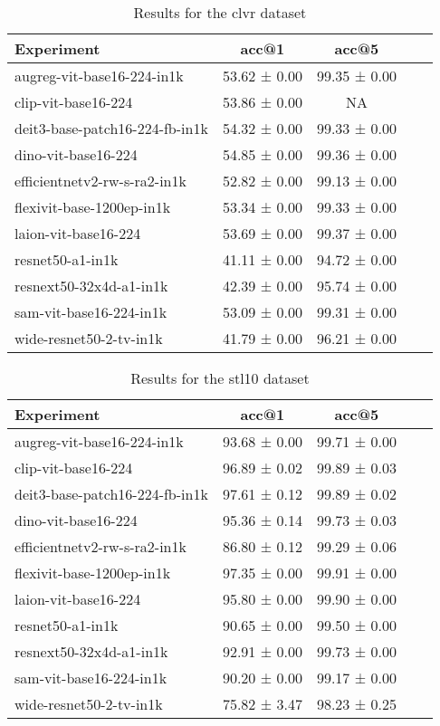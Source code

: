 \begin{table}[htbp]
\caption{Results for the clvr dataset}
\begin{tabular}{|l|c|c|c|c|}\hline
Experiment & acc@1 & acc@5\\
\hline
augreg-vit-base16-224-in1k & 53.62 ± 0.00 & 99.35 ± 0.00\\
\hline
clip-vit-base16-224 & 53.86 ± 0.00 & NA\\
\hline
deit3-base-patch16-224-fb-in1k & 54.32 ± 0.00 & 99.33 ± 0.00\\
\hline
dino-vit-base16-224 & 54.85 ± 0.00 & 99.36 ± 0.00\\
\hline
efficientnetv2-rw-s-ra2-in1k & 52.82 ± 0.00 & 99.13 ± 0.00\\
\hline
flexivit-base-1200ep-in1k & 53.34 ± 0.00 & 99.33 ± 0.00\\
\hline
laion-vit-base16-224 & 53.69 ± 0.00 & 99.37 ± 0.00\\
\hline
resnet50-a1-in1k & 41.11 ± 0.00 & 94.72 ± 0.00\\
\hline
resnext50-32x4d-a1-in1k & 42.39 ± 0.00 & 95.74 ± 0.00\\
\hline
sam-vit-base16-224-in1k & 53.09 ± 0.00 & 99.31 ± 0.00\\
\hline
wide-resnet50-2-tv-in1k & 41.79 ± 0.00 & 96.21 ± 0.00\\
\hline
\end{tabular}
\end{table}

\begin{table}[htbp]
\caption{Results for the stl10 dataset}
\begin{tabular}{|l|c|c|c|c|}\hline
Experiment & acc@1 & acc@5\\
\hline
augreg-vit-base16-224-in1k & 93.68 ± 0.00 & 99.71 ± 0.00\\
\hline
clip-vit-base16-224 & 96.89 ± 0.02 & 99.89 ± 0.03\\
\hline
deit3-base-patch16-224-fb-in1k & 97.61 ± 0.12 & 99.89 ± 0.02\\
\hline
dino-vit-base16-224 & 95.36 ± 0.14 & 99.73 ± 0.03\\
\hline
efficientnetv2-rw-s-ra2-in1k & 86.80 ± 0.12 & 99.29 ± 0.06\\
\hline
flexivit-base-1200ep-in1k & 97.35 ± 0.00 & 99.91 ± 0.00\\
\hline
laion-vit-base16-224 & 95.80 ± 0.00 & 99.90 ± 0.00\\
\hline
resnet50-a1-in1k & 90.65 ± 0.00 & 99.50 ± 0.00\\
\hline
resnext50-32x4d-a1-in1k & 92.91 ± 0.00 & 99.73 ± 0.00\\
\hline
sam-vit-base16-224-in1k & 90.20 ± 0.00 & 99.17 ± 0.00\\
\hline
wide-resnet50-2-tv-in1k & 75.82 ± 3.47 & 98.23 ± 0.25\\
\hline
\end{tabular}
\end{table}

